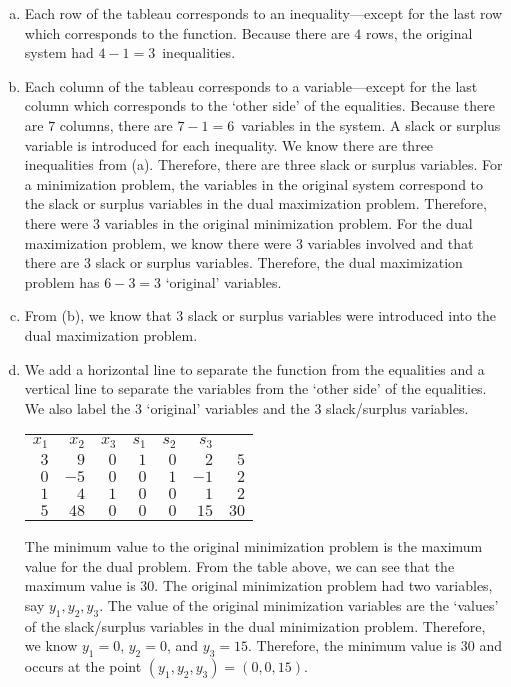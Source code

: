 \documentclass[11pt,letterpaper]{article}
\begin{document}
\sol 
\begin{enumerate}[(a)]
\item Each row of the tableau corresponds to an inequality---except for the last row which corresponds to the function. Because there are $4$ rows, the original system had $4 - 1= 3$~inequalities. 

\item Each column of the tableau corresponds to a variable---except for the last column which corresponds to the `other side' of the equalities. Because there are $7$ columns, there are $7 - 1= 6$~variables in the system. A slack or surplus variable is introduced for each inequality. We know there are three inequalities from (a). Therefore, there are three slack or surplus variables. For a minimization problem, the variables in the original system correspond to the slack or surplus variables in the dual maximization problem. Therefore, there were $3$ variables in the original minimization problem. For the dual maximization problem, we know there were $3$ variables involved and that there are $3$ slack or surplus variables. Therefore, the dual maximization problem has $6 - 3= 3$ `original' variables. 

\item From (b), we know that $3$ slack or surplus variables were introduced into the dual maximization problem. 

\item We add a horizontal line to separate the function from the equalities and a vertical line to separate the variables from the `other side' of the equalities. We also label the $3$ `original' variables and the $3$ slack/surplus variables. \par
	\begin{table}[H]
	\centering
	\begin{tabular}{rrrrrrr}
	{\footnotesize$x_1$} & {\footnotesize$x_2$} & {\footnotesize$x_3$} & {\footnotesize$s_1$} & {\footnotesize$s_2$} & {\footnotesize$s_3$} & \\
	$3$ & $9$ & $0$ & $1$ & $0$ & \multicolumn{1}{r|}{$2$} & $5$ \\
	$0$ & $-5$ & $0$ & $0$ & $1$ & \multicolumn{1}{r|}{$-1$} & $2$ \\
	$1$ & $4$ & $1$ & $0$ & $0$ & \multicolumn{1}{r|}{$1$} & $2$ \\ \hline
	$5$ & $48$ & $0$ & $0$ & $0$ & \multicolumn{1}{r|}{$15$} & $30$
	\end{tabular}
	\end{table} \par
The minimum value to the original minimization problem is the maximum value for the dual problem. From the table above, we can see that the maximum value is $30$. The original minimization problem had two variables, say $y_1, y_2, y_3$. The value of the original minimization variables are the `values' of the slack/surplus variables in the dual minimization problem. Therefore, we know $y_1= 0$, $y_2= 0$, and $y_3= 15$. Therefore, the minimum value is $30$ and occurs at the point $(y_1, y_2, y_3)= (0, 0, 15)$. 
\end{enumerate}
\end{document}
